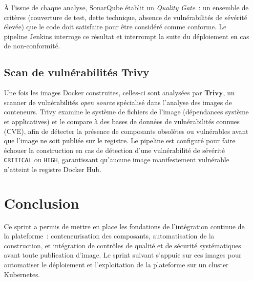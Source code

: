 À l'issue de chaque analyse, SonarQube établit un \emph{Quality Gate}~: un ensemble de critères (couverture de test, dette technique, absence de vulnérabilités de sévérité élevée) que le code doit satisfaire pour être considéré comme conforme. Le pipeline Jenkins interroge ce résultat et interrompt la suite du déploiement en cas de non-conformité.

\subsection{Scan de vulnérabilités Trivy}

Une fois les images Docker construites, celles-ci sont analysées par \textbf{Trivy}, un scanner de vulnérabilités \emph{open source} spécialisé dans l'analyse des images de conteneurs. Trivy examine le système de fichiers de l'image (dépendances système et applicatives) et le compare à des bases de données de vulnérabilités connues (CVE), afin de détecter la présence de composants obsolètes ou vulnérables avant que l'image ne soit publiée sur le registre. Le pipeline est configuré pour faire échouer la construction en cas de détection d'une vulnérabilité de sévérité \texttt{CRITICAL} ou \texttt{HIGH}, garantissant qu'aucune image manifestement vulnérable n'atteint le registre Docker Hub.

\section*{Conclusion}

Ce sprint a permis de mettre en place les fondations de l'intégration continue de la plateforme~: conteneurisation des composants, automatisation de la construction, et intégration de contrôles de qualité et de sécurité systématiques avant toute publication d'image. Le sprint suivant s'appuie sur ces images pour automatiser le déploiement et l'exploitation de la plateforme sur un cluster Kubernetes.
